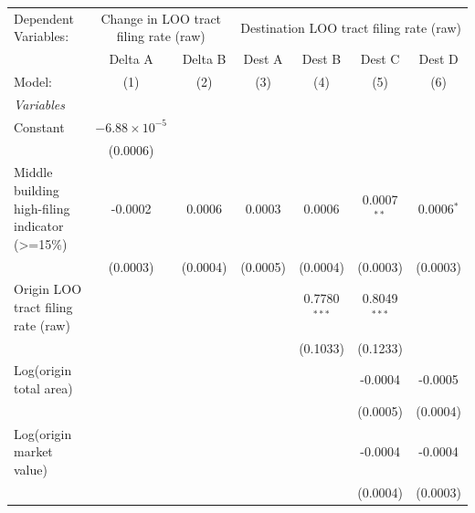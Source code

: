 \begingroup
\centering
\begin{tabular}{lcccccc}
   \tabularnewline \midrule \midrule
   Dependent Variables: & \multicolumn{2}{c}{Change in LOO tract filing rate (raw)} & \multicolumn{4}{c}{Destination LOO tract filing rate (raw)}\\
                                                   & Delta A                & Delta B  & Dest A   & Dest B         & Dest C         & Dest D \\   
   Model:                                          & (1)                    & (2)      & (3)      & (4)            & (5)            & (6)\\  
   \midrule
   \emph{Variables}\\
   Constant                                        & $-6.88\times 10^{-5}$  &          &          &                &                &   \\   
                                                   & (0.0006)               &          &          &                &                &   \\   
   Middle building high-filing indicator (>=15\%)  & -0.0002                & 0.0006   & 0.0003   & 0.0006         & 0.0007$^{**}$  & 0.0006$^{*}$\\   
                                                   & (0.0003)               & (0.0004) & (0.0005) & (0.0004)       & (0.0003)       & (0.0003)\\   
   Origin LOO tract filing rate (raw)              &                        &          &          & 0.7780$^{***}$ & 0.8049$^{***}$ &   \\   
                                                   &                        &          &          & (0.1033)       & (0.1233)       &   \\   
   Log(origin total area)                          &                        &          &          &                & -0.0004        & -0.0005\\   
                                                   &                        &          &          &                & (0.0005)       & (0.0004)\\   
   Log(origin market value)                        &                        &          &          &                & -0.0004        & -0.0004\\   
                                                   &                        &          &          &                & (0.0004)       & (0.0003)\\   

\end{tabular}
